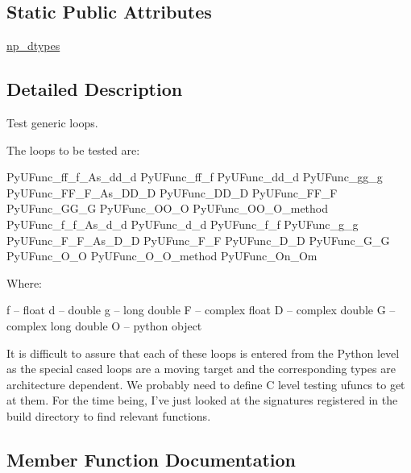 \subsection*{Static Public Attributes}
\begin{DoxyCompactItemize}
\item 
\hyperlink{classnumpy_1_1core_1_1tests_1_1test__ufunc_1_1TestUfuncGenericLoops_a809c17a282711607db54e16bafe02fcb}{np\+\_\+dtypes}
\end{DoxyCompactItemize}


\subsection{Detailed Description}
\begin{DoxyVerb}Test generic loops.

The loops to be tested are:

    PyUFunc_ff_f_As_dd_d
    PyUFunc_ff_f
    PyUFunc_dd_d
    PyUFunc_gg_g
    PyUFunc_FF_F_As_DD_D
    PyUFunc_DD_D
    PyUFunc_FF_F
    PyUFunc_GG_G
    PyUFunc_OO_O
    PyUFunc_OO_O_method
    PyUFunc_f_f_As_d_d
    PyUFunc_d_d
    PyUFunc_f_f
    PyUFunc_g_g
    PyUFunc_F_F_As_D_D
    PyUFunc_F_F
    PyUFunc_D_D
    PyUFunc_G_G
    PyUFunc_O_O
    PyUFunc_O_O_method
    PyUFunc_On_Om

Where:

    f -- float
    d -- double
    g -- long double
    F -- complex float
    D -- complex double
    G -- complex long double
    O -- python object

It is difficult to assure that each of these loops is entered from the
Python level as the special cased loops are a moving target and the
corresponding types are architecture dependent. We probably need to
define C level testing ufuncs to get at them. For the time being, I've
just looked at the signatures registered in the build directory to find
relevant functions.\end{DoxyVerb}
 

\subsection{Member Function Documentation}
\mbox{\label{classnumpy_1_1core_1_1tests_1_1test__ufunc_1_1TestUfuncGenericLoops_ab4c7f17e3885d1bab81506ef9fa88076}} 
